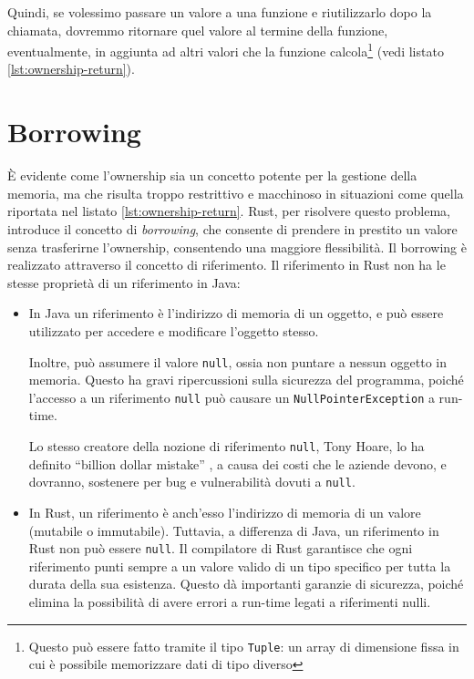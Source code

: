 Quindi, se volessimo passare un valore a una funzione e riutilizzarlo dopo la chiamata, dovremmo ritornare quel valore al termine della funzione, eventualmente, in aggiunta ad altri valori che la funzione calcola\footnote{Questo può essere fatto tramite il tipo \texttt{Tuple}: un array di dimensione fissa in cui è possibile memorizzare dati di tipo diverso} (vedi listato \ref{lst:ownership-return}). 

\section{Borrowing}
\label{sec:borrowing}
È evidente come l'ownership sia un concetto potente per la gestione della memoria, ma che risulta troppo restrittivo e macchinoso in situazioni come quella riportata nel listato \ref{lst:ownership-return}. Rust, per risolvere questo problema, introduce il concetto di \textit{borrowing}, che consente di prendere in prestito un valore senza trasferirne l'ownership, consentendo una maggiore flessibilità. Il borrowing è realizzato attraverso il concetto di riferimento. Il riferimento in Rust non ha le stesse proprietà di un riferimento in Java: 
\begin{itemize}
    \item In Java un riferimento è l'indirizzo di memoria di un oggetto, e può essere utilizzato per accedere e modificare l'oggetto stesso. 
    
    Inoltre, può assumere il valore \texttt{null}, ossia non puntare a nessun oggetto in memoria. Questo ha gravi ripercussioni sulla sicurezza del programma, poiché l'accesso a un riferimento \texttt{null} può causare un \texttt{NullPointerException} a run-time. 
    
    Lo stesso creatore della nozione di riferimento \texttt{null}, Tony Hoare, lo ha definito ``billion dollar mistake'' \cite{hoare-null-reference}, a causa dei costi che le aziende devono, e dovranno, sostenere per bug e vulnerabilità dovuti a \texttt{null}.
    \item In Rust, un riferimento è anch'esso l'indirizzo di memoria di un valore (mutabile o immutabile). Tuttavia, a differenza di Java, un riferimento in Rust non può essere \texttt{null}. Il compilatore di Rust garantisce che ogni riferimento punti sempre a un valore valido di un tipo specifico per tutta la durata della sua esistenza. Questo dà importanti garanzie di sicurezza, poiché elimina la possibilità di avere errori a run-time legati a riferimenti nulli.
\end{itemize}

